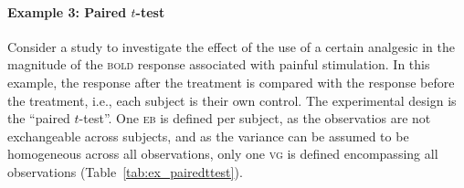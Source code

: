\paragraph{Example 3: Paired $t$-test} Consider a study to investigate the effect of the use of a certain analgesic in the magnitude of the \textsc{bold} response associated with painful stimulation. In this example, the response after the treatment is compared with the response before the treatment, i.e., each subject is their own control. The experimental design is the ``paired $t$-test''. One \textsc{eb} is defined per subject, as the observatios are not exchangeable across subjects, and as the variance can be assumed to be homogeneous across all observations, only one \textsc{vg} is defined encompassing all observations (Table~\ref{tab:ex_pairedttest}).

